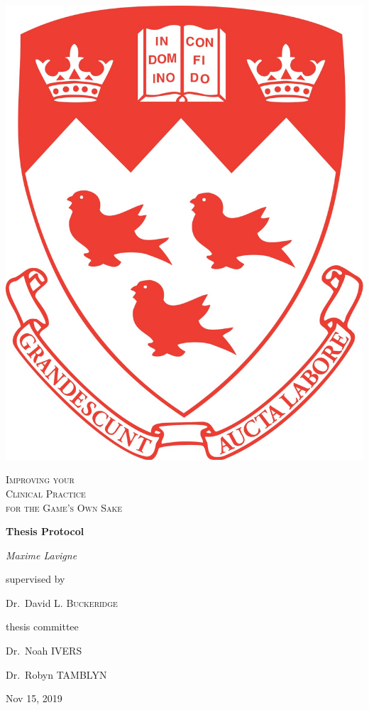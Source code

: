 \AtBeginShipoutNext{\AtBeginShipoutNext{\AtBeginShipoutDiscard}}
\begin{titlingpage}

\begin{minipage}[c]{0.23\textwidth}
\raggedright 
\includegraphics[width=0.75\linewidth]{coa.jpg}
\end{minipage}%
\vrule width 2pt
\begin{minipage}[c]{0.73\textwidth}
	\centering
	
	\vspace{5cm}
	{\huge\scshape Improving your\\Clinical Practice \\ \vspace{0.5cm} for the Game's Own Sake}
	
	\vspace{2cm}
	{\Large\bfseries Thesis Protocol\par}
	
	\vspace{2cm}
	{\Large\itshape Maxime Lavigne\par}
	
	\vspace{2cm}
	supervised by\par
	Dr.~David L. \textsc{Buckeridge}
	
	\vspace{2cm}
	thesis committee\par
	Dr.~Noah \textsc{IVERS}\par
	Dr.~Robyn \textsc{TAMBLYN}\par

	\vspace{2cm}
	{\large Nov 15, 2019\par}
\end{minipage}%

\end{titlingpage}